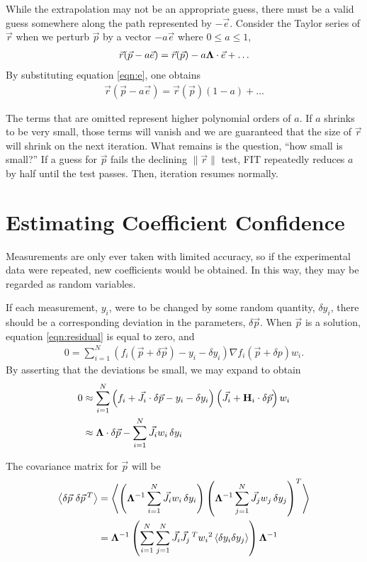 \documentclass{article}
\def\p{\vec{p}}
\def\r{\vec{r}}
\def\J{\vec{J}}
\def\H{{\bf H}}
\def\LAM{{\bf \Lambda}}
\begin{document}
While the extrapolation may not be an appropriate guess, there must be a valid guess somewhere along the path represented by $-\vec{e}$.  Consider the Taylor series of $\r$ when we perturb $\p$ by a vector $-a\vec{e}$ where $0\le a\le 1$,
\begin{align}
\r(\p-a\vec{e}) = \r(\p) - a \LAM \cdot \vec{e} + \ldots
\end{align}
By substituting equation \ref{eqn:e}, one obtains
\begin{align}
\r(\p-a\vec{e}) = \r(\p) (1-a) + \ldots
\end{align}

The terms that are omitted represent higher polynomial orders of $a$.  If $a$ shrinks to be very small, those terms will vanish and we are guaranteed that the size of $\r$ will shrink on the next iteration.  What remains is the question, ``how small is small?''  If a guess for $\p$ fails the declining $\|\r\|$ test, FIT repeatedly reduces $a$ by half until the test passes.  Then, iteration resumes normally.

\section{Estimating Coefficient Confidence}
Measurements are only ever taken with limited accuracy, so if the experimental data were repeated, new coefficients would be obtained.  In this way, they may be regarded as random variables.

If each measurement, $y_i$, were to be changed by some random quantity, $\delta y_i$, there should be a corresponding deviation in the parameters, $\delta \p$.  When $\p$ is a solution, equation \ref{eqn:residual} is equal to zero, and
\begin{align}
0 = \sum_{i=1}^N \left( f_i(\p + \delta \p) - y_i - \delta y_i \right) \nabla f_i(\p + \delta p) w_i.
\end{align}
By asserting that the deviations be small, we may expand to obtain
\begin{align}
0 &\approx \sum_{i=1}^N \left( f_i + \J_i \cdot \delta\p - y_i - \delta y_i \right) \left( \J_i + \H_i\cdot\delta\p \right)w_i \nonumber\\
&\approx \LAM \cdot \delta \p - \sum_{i=1}^N \J_i w_i\, \delta y_i\nonumber
\end{align}

The covariance matrix for $\p$ will be
\begin{align}
\left\langle \delta\p\ \delta\p\,{^T} \right\rangle &= \left\langle \left(\LAM^{-1} \sum_{i=1}^N \J_i w_i\, \delta y_i \right) \left(\LAM^{-1} \sum_{j=1}^N \J_j w_j\, \delta y_j\right)^T \right\rangle\nonumber\\
&= \LAM^{-1} \left( \sum_{i=1}^N \sum_{j=1}^N \J_i \J_j\,{^T} w_i{^2} \left\langle \delta y_i \delta y_j \right\rangle \right) \LAM^{-1} \nonumber
\end{align}
\end{document}
